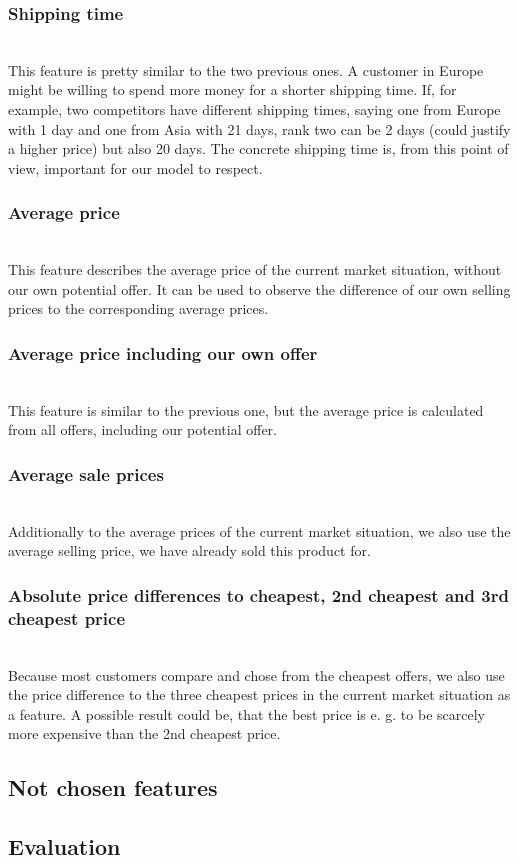 \subsubsection{Shipping time}
	~\\
	This feature is pretty similar to the two previous ones. A customer in Europe might be willing to spend more money for a shorter shipping time. If, for example, two competitors have different shipping times, saying one from Europe with 1 day and one from Asia with 21 days, rank two can be 2 days (could justify a higher price) but also 20 days. The concrete shipping time is, from this point of view, important for our model to respect.
\subsubsection{Average price}
	~\\
	This feature describes the average price of the current market situation, without our own potential offer. It can be used to observe the difference of our own selling prices to the corresponding average prices.
\subsubsection{Average price including our own offer}
	~\\
	This feature is similar to the previous one, but the average price is calculated from all offers, including our potential offer.
\subsubsection{Average sale prices}
	~\\
	Additionally to the average prices of the current market situation, we also use the average selling price, we have already sold this product for.
\subsubsection{Absolute price differences to cheapest, 2nd cheapest and 3rd cheapest price}
	~\\
	Because most customers compare and chose from the cheapest offers, we also use the price difference to the three cheapest prices in the current market situation as a feature. A possible result could be, that the best price is e. g. to be scarcely more expensive than the 2nd cheapest price.
\subsection{Not chosen features}
\subsection{Evaluation}
